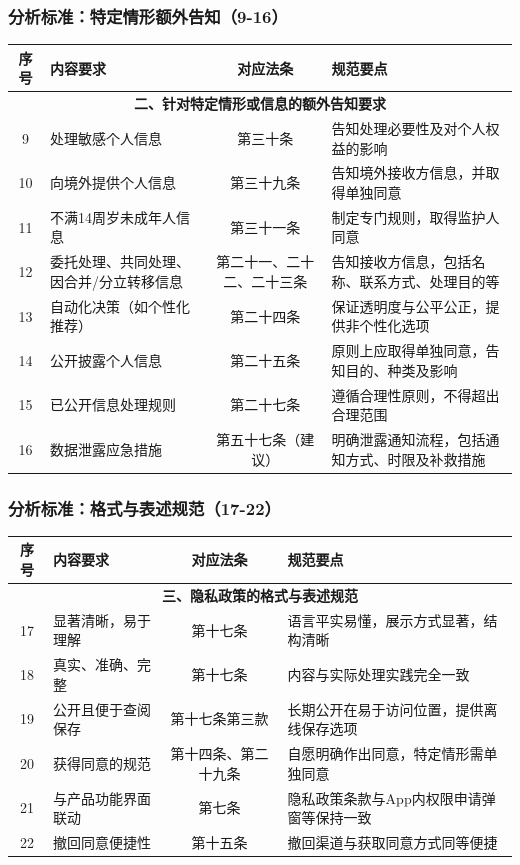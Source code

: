\documentclass[AutoFakeBold,AutoFakeSlant]{beamer}
\begin{document}
\begin{frame}
	\frametitle{分析标准：特定情形额外告知（9-16）}
	\tiny
	\begin{tabularx}{\textwidth}{|c|X|c|X|}
		\toprule
		\textbf{序号} & \textbf{内容要求} & \textbf{对应法条} & \textbf{规范要点} \\
		\midrule
		\multicolumn{4}{|c|}{\textbf{二、针对特定情形或信息的额外告知要求}} \\
		\midrule
		9 & 处理敏感个人信息 & 第三十条 & 告知处理必要性及对个人权益的影响 \\
		\midrule
		10 & 向境外提供个人信息 & 第三十九条 & 告知境外接收方信息，并取得单独同意 \\
		\midrule
		11 & 不满14周岁未成年人信息 & 第三十一条 & 制定专门规则，取得监护人同意 \\
		\midrule
		12 & 委托处理、共同处理、因合并/分立转移信息 & 第二十一、二十二、二十三条 & 告知接收方信息，包括名称、联系方式、处理目的等 \\
		\midrule
		13 & 自动化决策（如个性化推荐） & 第二十四条 & 保证透明度与公平公正，提供非个性化选项 \\
		\midrule
		14 & 公开披露个人信息 & 第二十五条 & 原则上应取得单独同意，告知目的、种类及影响 \\
		\midrule
		15 & 已公开信息处理规则 & 第二十七条 & 遵循合理性原则，不得超出合理范围 \\
		\midrule
		16 & 数据泄露应急措施 & 第五十七条（建议） & 明确泄露通知流程，包括通知方式、时限及补救措施 \\
		\bottomrule
	\end{tabularx}
\end{frame}

\begin{frame}
	\frametitle{分析标准：格式与表述规范（17-22）}
	\tiny
	\begin{tabularx}{\textwidth}{|c|X|c|X|}
		\toprule
		\textbf{序号} & \textbf{内容要求} & \textbf{对应法条} & \textbf{规范要点} \\
		\midrule
		\multicolumn{4}{|c|}{\textbf{三、隐私政策的格式与表述规范}} \\
		\midrule
		17 & 显著清晰，易于理解 & 第十七条 & 语言平实易懂，展示方式显著，结构清晰 \\
		\midrule
		18 & 真实、准确、完整 & 第十七条 & 内容与实际处理实践完全一致 \\
		\midrule
		19 & 公开且便于查阅保存 & 第十七条第三款 & 长期公开在易于访问位置，提供离线保存选项 \\
		\midrule
		20 & 获得同意的规范 & 第十四条、第二十九条 & 自愿明确作出同意，特定情形需单独同意 \\
		\midrule
		21 & 与产品功能界面联动 & 第七条 & 隐私政策条款与App内权限申请弹窗等保持一致 \\
		\midrule
		22 & 撤回同意便捷性 & 第十五条 & 撤回渠道与获取同意方式同等便捷 \\
		\bottomrule
	\end{tabularx}
\end{frame}
\end{document}
